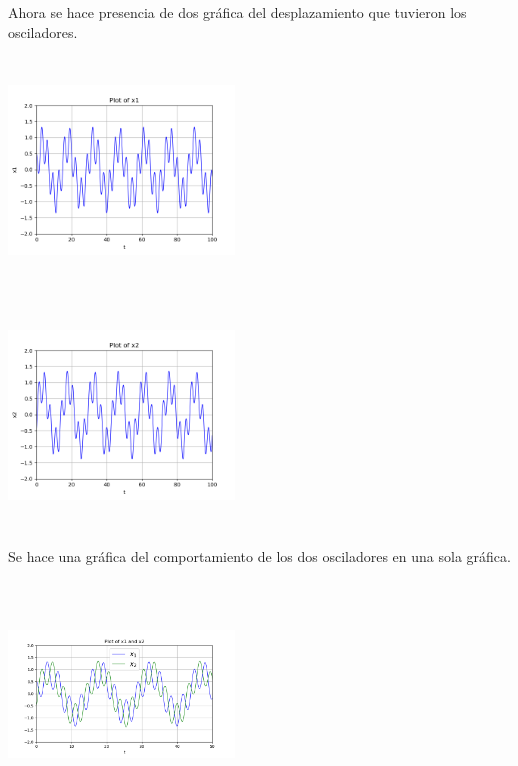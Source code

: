 \documentclass{article}
\begin{document}
Ahora se hace presencia de dos gráfica del desplazamiento que tuvieron los osciladores.
\begin{center}
  \includegraphics[width=6cm, height=6cm]{ej2_33.png}
\end{center}

\begin{center}
  \includegraphics[width=6cm, height=6cm]{ej2_34.png}
\end{center}

Se hace una gráfica del comportamiento de los dos osciladores en una sola gráfica.
\begin{center}
  \includegraphics[width=6cm, height=6cm]{ej2_35.png}
\end{center}
\end{document}
